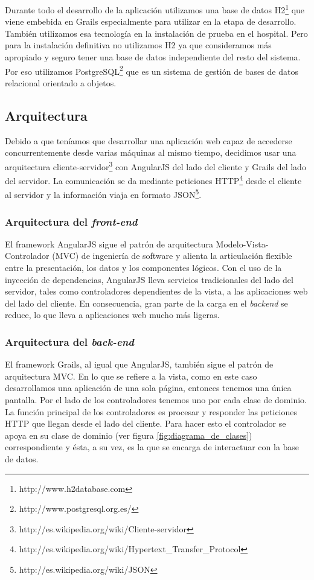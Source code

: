 Durante todo el desarrollo de la aplicación utilizamos una base de datos H2\footnote{http://www.h2database.com} que viene embebida en Grails especialmente para utilizar en la etapa de desarrollo. También utilizamos esa tecnología en la instalación de prueba en el hospital. Pero para la instalación definitiva no utilizamos H2 ya que consideramos más apropiado y seguro tener una base de datos independiente del resto del sistema. Por eso utilizamos PostgreSQL\footnote{http://www.postgresql.org.es/} que es un sistema de gestión de bases de datos relacional orientado a objetos.


\subsection{Arquitectura}
Debido a que teníamos que desarrollar una aplicación web capaz de accederse concurrentemente desde varias máquinas al mismo tiempo, decidimos usar una arquitectura cliente-servidor\footnote{http://es.wikipedia.org/wiki/Cliente-servidor} con AngularJS del lado del cliente y Grails del lado del servidor. La comunicación se da mediante peticiones HTTP\footnote{http://es.wikipedia.org/wiki/Hypertext\_Transfer\_Protocol} desde el cliente al servidor y la información viaja en formato JSON\footnote{http://es.wikipedia.org/wiki/JSON}.


\subsubsection{Arquitectura del \textit{front-end}}
El framework AngularJS sigue el patrón de arquitectura Modelo-Vista-Controlador (MVC) de ingeniería de software y alienta la articulación flexible entre la presentación, los datos y los componentes lógicos. Con el uso de la inyección de dependencias, AngularJS lleva servicios tradicionales del lado del servidor, tales como controladores dependientes de la vista, a las aplicaciones web del lado del cliente. En consecuencia, gran parte de la carga en el \textit{backend} se reduce, lo que lleva a aplicaciones web mucho más ligeras.

\subsubsection{Arquitectura del \textit{back-end}}
El framework Grails, al igual que AngularJS, también sigue el patrón de arquitectura MVC. En lo que se refiere a la vista, como en este caso desarrollamos una aplicación de una sola página, entonces tenemos una única pantalla. Por el lado de los controladores tenemos uno por cada clase de dominio. La función principal de los controladores es procesar y responder las peticiones HTTP que llegan desde el lado del cliente. Para hacer esto el controlador se apoya en su clase de dominio (ver figura \ref{fig:diagrama_de_clases}) correspondiente y ésta, a su vez, es la que se encarga de interactuar con la base de datos.

